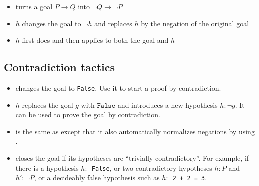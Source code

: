 \documentclass[a4paper]{article}
\newcommand{\False}{\texttt{False}}
\begin{document}
\begin{itemize}
    \item \contrapose turns a goal $P \to Q$ into $\neg Q \to \neg P$
    \item \contrapose $h$ changes the goal to $\neg h$ and replaces $h$ by the negation of the original goal
\end{itemize}


\begin{itemize}
    \item \contraposel $h$ first does \contrapose and then applies \pushneg to both the goal and $h$
\end{itemize}


\subsection*{Contradiction tactics}


\begin{itemize}
    \item \exfalso changes the goal to \False.
    Use it to start a proof by contradiction.
\end{itemize}


\begin{itemize}
    \item \texttt{\bycontra $h$} replaces the goal $g$ with $\False$ and introduces a new hypothesis $h : \neg g$.
    It can be used to prove the goal by contradiction.
\end{itemize}


\begin{itemize}
    \item \texttt{\bycontral} is the same as \texttt{\bycontra} except that it also automatically normalizes negations by using \pushneg.
\end{itemize}


\begin{itemize}
    \item \contradiction closes the goal if its hypotheses are ``trivially contradictory''. For example, if there is a hypothesis \texttt{$h:$ False}, or two contradictory hypotheses $h : P$ and $h' : \neg P$, or a decideably false hypothesis such as \texttt{$h:$ 2 + 2 = 3}.
\end{itemize}
\end{document}
